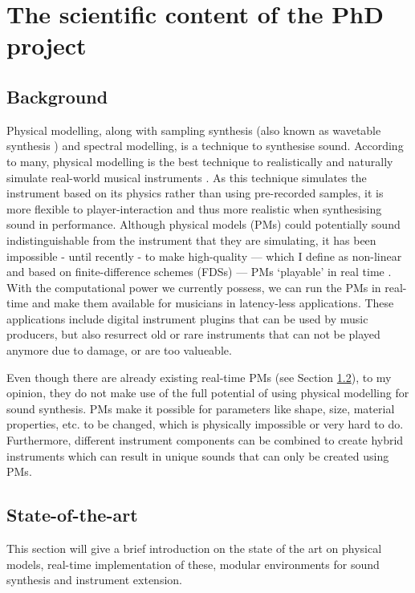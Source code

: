 \section{The scientific content of the PhD project}

\subsection{Background}
Physical modelling, along with sampling synthesis (also known as wavetable synthesis \cite{Smith2010a}) and spectral modelling, is a technique to synthesise sound. According to many, physical modelling is the best technique to realistically and naturally simulate real-world musical instruments \cite{Valimaki2006, Smith2010b, Bilbao2009}. As this technique simulates the instrument based on its physics rather than using pre-recorded samples, it is more flexible to player-interaction and thus more realistic when synthesising sound in performance. Although physical models (PMs) could potentially sound indistinguishable from the instrument that they are simulating, it has been impossible - until recently - to make high-quality — which I define as non-linear and based on finite-difference schemes (FDSs) — PMs ‘playable’ in real time \cite{Smith2010a}. With the computational power we currently possess, we can run the PMs in real-time and make them available for musicians in latency-less applications. These applications include digital instrument plugins that can be used by music producers, but also resurrect old or rare instruments that can not be played anymore due to damage, or are too valueable. 

Even though there are already existing real-time PMs (see Section \ref{SOTA}), to my opinion, they do not make use of the full potential of using physical modelling for sound synthesis. PMs make it possible for parameters like shape, size, material properties, etc. to be changed, which is physically impossible or very hard to do. Furthermore, different instrument components can be combined to create hybrid instruments which can result in unique sounds that can only be created using PMs.

\subsection{State-of-the-art}\label{SOTA}
This section will give a brief introduction on the state of the art on physical models, real-time implementation of these, modular environments for sound synthesis and instrument extension.

